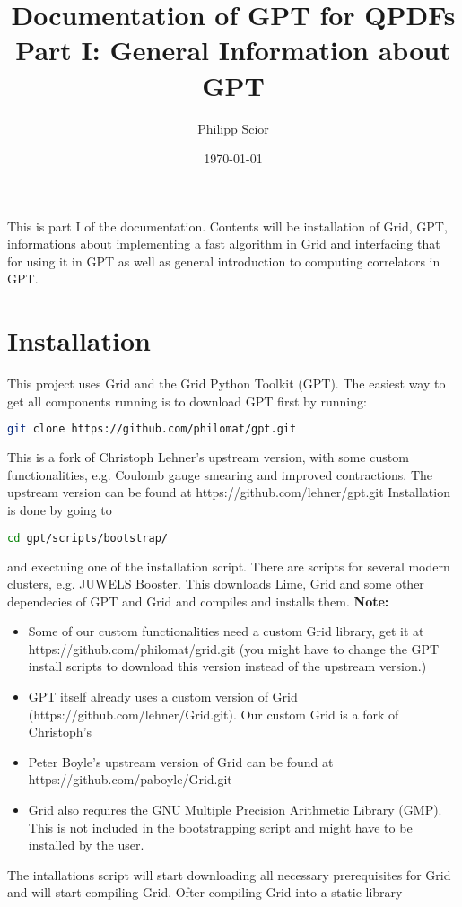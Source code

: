 \documentclass[a4paper,10pt]{scrartcl}
\title{Documentation of GPT for QPDFs \newline Part I: General Information about GPT}
\author{Philipp Scior}
\date{\today}
\begin{document}
\maketitle
This is part I of the documentation. Contents will be installation of Grid, GPT, informations about implementing a fast algorithm in Grid and interfacing that
for using it in GPT as well as general introduction to computing correlators in GPT.

\section{Installation}
This project uses Grid and the Grid Python Toolkit (GPT). The easiest way to get all components running is to download GPT first by running:
\begin{lstlisting}[language=bash]
    git clone https://github.com/philomat/gpt.git
\end{lstlisting}
This is a fork of Christoph Lehner's upstream version, with some custom functionalities, e.g. Coulomb gauge smearing and improved contractions. The upstream
version can be found at https://github.com/lehner/gpt.git
Installation is done by going to 
\begin{lstlisting}[language=bash]
    cd gpt/scripts/bootstrap/
\end{lstlisting}
and exectuing one of the installation script. There are scripts for several modern clusters, e.g. JUWELS Booster.
This downloads Lime, Grid and some other dependecies of GPT and Grid and compiles and installs them. \newline
\textbf{Note:}
\begin{itemize}
    \item Some of our custom functionalities need a custom Grid library, get it at https://github.com/philomat/grid.git (you might have to change the GPT install
    scripts to download this version instead of the upstream version.)
    \item GPT itself already uses a custom version of Grid (https://github.com/lehner/Grid.git). Our custom Grid is a fork of Christoph's
    \item Peter Boyle's upstream version of Grid can be found at https://github.com/paboyle/Grid.git
    \item Grid also requires the GNU Multiple Precision Arithmetic Library (GMP). This is not included in the bootstrapping script and might have to be 
    installed by the user.
\end{itemize}
The intallations script will start downloading all necessary prerequisites for Grid and will start compiling Grid. Ofter compiling Grid into a static library
\end{document}
